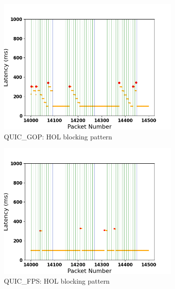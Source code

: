\documentclass{mpaper}
\begin{document}
\begin{figure}
\begin{subfigure}[b]{0.32\textwidth}
      \centering
      \includegraphics[width=\textwidth]{SAL/QUIC_GOP_Stack_Latency_Available.png}
      \caption{QUIC\_GOP: HOL blocking pattern}
      \label{fig:GOPSA}
  \end{subfigure}
  \begin{subfigure}[b]{0.32\textwidth}
      \centering
      \includegraphics[width=\textwidth]{SAL/QUIC_FPS_Stack_Latency_Available.png}
      \caption{QUIC\_FPS: HOL blocking pattern}
      \label{fig:FPSSA}
  \end{subfigure}
  \hfill
  \begin{subfigure}[b]{0.32\textwidth}
      \centering

\end{subfigure}
\end{figure}
\end{document}
